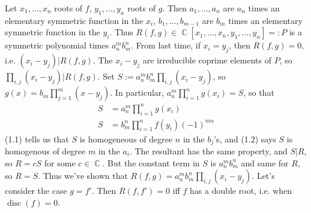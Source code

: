 \documentclass[11pt, a4paper]{memoir}
\DeclareMathOperator{\C}{{\mathbb{C}}}
\theoremstyle{change}
\theoremstyle{plain}
\theoremstyle{nonumberplain}
\DeclareMathOperator{\disc}{disc}
\begin{document}
Let $x_1,\ldots,x_n$ roots of $f$, $y_1,\ldots,y_n$ roots of $g$.
Then $a_1,\ldots,a_n$ are $a_n$ times an elementary symmetric function in the $x_i$, $b_1,\ldots,b_{m-1}$ are $b_m$ times an elementary symmetric function in the $y_i$.
Thus $R(f,g)\in \C[x_1,\ldots,x_n,y_1,\ldots,y_n]=:P$ is a symmetric polynomial times $a_n^mb_m^n$.
From last time, if $x_i=y_j$, then $R(f,g)=0$, i.e. $(x_i-y_j)|R(f,g)$.
The $x_i-y_j$ are irreducible coprime elements of $P$, so $\prod_{i,j}(x_i-y_j)|R(f,g)$.
Set $S:=a_n^mb_m^n\prod_{i,j}(x_i-y_j)$, so $g(x)=b_m\prod_{j=1}^m(x-y_j)$.
In particular, $a_n^m\prod_{i=1}^ng(x_i)=S$, so that
\begin{align}
    S&=a_n^m\prod_{i=1}^ng(x_i)\\
    S&=b_m^n\prod_{i=1}^nf(y_i)(-1)^{mn}
\end{align}
(1.1) tells us that $S$ is homogeneous of degree $n$ in the $b_j$'s, and (1.2) says $S$ is homogenous of degree $m$ in the $a_i$.
The resultant has the same property, and $S|R$, so $R=cS$ for some $c\in\C$.
But the constant term in $S$ is $a_n^mb_m^n$ and same for $R$, so $R=S$.
Thus we've shown that $R(f,g)=a_n^mb_m^n\prod_{i,j}(x_i-y_j)$.
Let's consider the case $g=f'$.
Then $R(f,f')=0$ iff $f$ has a double root, i.e. when $\disc(f)=0$.
\end{document}
